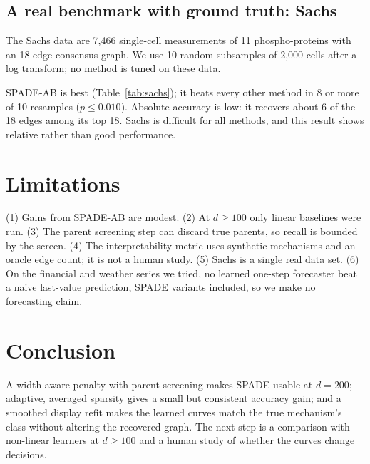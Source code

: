 \documentclass[11pt]{article}
\begin{document}
\subsection{A real benchmark with ground truth: Sachs}
The Sachs data are 7{,}466 single-cell measurements of 11 phospho-proteins with an 18-edge consensus graph. We use
10 random subsamples of 2{,}000 cells after a log transform; no method is tuned on these data.
\begin{table}[t]\centering\small
\caption{Sachs, 10 subsamples of $2{,}000$ cells (chance AUPRC $=0.164$). SPADE-AB and plain SPADE use the settings
fixed on synthetic data.}
\label{tab:sachs}

\end{table}
SPADE-AB is best (Table~\ref{tab:sachs}); it beats every other method in 8 or more of 10 resamples ($p\le0.010$).
Absolute accuracy is low: it recovers about 6 of the 18 edges among its top 18. Sachs is difficult for all methods,
and this result shows relative rather than good performance.

\section{Limitations}
(1) Gains from SPADE-AB are modest. (2) At $d\ge100$ only linear baselines were run. (3) The parent screening step
can discard true parents, so recall is bounded by the screen. (4) The interpretability metric uses synthetic
mechanisms and an oracle edge count; it is not a human study. (5) Sachs is a single real data set. (6) On the
financial and weather series we tried, no learned one-step forecaster beat a naive last-value prediction, SPADE
variants included, so we make no forecasting claim.

\section{Conclusion}
A width-aware penalty with parent screening makes SPADE usable at $d=200$; adaptive, averaged sparsity gives a small
but consistent accuracy gain; and a smoothed display refit makes the learned curves match the true mechanism's class
without altering the recovered graph. The next step is a comparison with non-linear learners at $d\ge100$ and a
human study of whether the curves change decisions.



\end{document}
